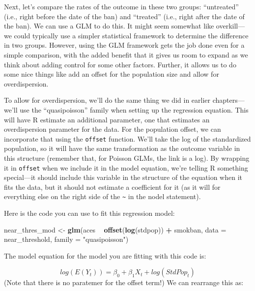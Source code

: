 \documentclass[
]{book}
\newenvironment{Shaded}{\begin{snugshade}}{\end{snugshade}}
\newcommand{\DataTypeTok}[1]{\textcolor[rgb]{0.13,0.29,0.53}{#1}}
\newcommand{\KeywordTok}[1]{\textcolor[rgb]{0.13,0.29,0.53}{\textbf{#1}}}
\newcommand{\NormalTok}[1]{#1}
\newcommand{\OperatorTok}[1]{\textcolor[rgb]{0.81,0.36,0.00}{\textbf{#1}}}
\newcommand{\StringTok}[1]{\textcolor[rgb]{0.31,0.60,0.02}{#1}}
\begin{document}
Next, let's compare the rates of the outcome in these two groups: ``untreated'' (i.e., right before the date of the ban) and ``treated'' (i.e., right after the date of the ban). We can use a GLM to do this. It might seem somewhat like overkill---we could typically use a simpler statistical framework to determine the difference in two groups. However, using the GLM framework gets the job done even for a simple comparison, with the added benefit that it gives us room to expand as we think about adding control for some other factors. Further, it allows us to do some nice things like add an offset for the population size and allow for overdispersion.

To allow for overdispersion, we'll do the same thing we did in earlier chapters---we'll use the ``quasipoisson'' family when setting up the regression equation. This will have R estimate an additional parameter, one that estimates an overdispersion parameter for the data. For the population offset, we can incorporate that using the \texttt{offset} function. We'll take the log of the standardized population, so it will have the same transformation as the outcome variable in this structure (remember that, for Poisson GLMs, the link is a log). By wrapping it in \texttt{offset} when we include it in the model equation, we're telling R something special---it should include this variable in the structure of the equation when it fits the data, but it should not estimate a coefficient for it (as it will for everything else on the right side of the \texttt{\textasciitilde{}} in the nodel statement).

Here is the code you can use to fit this regression model:

\begin{Shaded}
\begin{Highlighting}[]
\NormalTok{near_thres_mod <-}\StringTok{ }\KeywordTok{glm}\NormalTok{(aces }\OperatorTok{~}\StringTok{ }\KeywordTok{offset}\NormalTok{(}\KeywordTok{log}\NormalTok{(stdpop)) }\OperatorTok{+}\StringTok{ }\NormalTok{smokban, }
                      \DataTypeTok{data =}\NormalTok{ near_threshold, }
                      \DataTypeTok{family =} \StringTok{"quasipoisson"}\NormalTok{)}
\end{Highlighting}
\end{Shaded}

The model equation for the model you are fitting with this code is:

\[
log(E(Y_t)) = \beta_0 + \beta_1 X_t + log(StdPop_t)
\]
(Note that there is no paratemer for the offset term!) We can rearrange this as:
\end{document}
